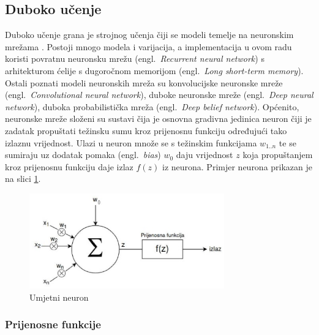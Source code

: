 \documentclass[times, utf8, zavrsni]{fer}
\begin{document}
\subsection{Duboko učenje}

Duboko učenje grana je strojnog učenja čiji se modeli temelje na neuronskim mrežama \citep{cupic}. Postoji mnogo modela i varijacija, a implementacija u ovom radu koristi povratnu neuronsku mrežu (engl.~\emph{Recurrent neural network}) s arhitekturom ćelije s dugoročnom memorijom (engl.~\emph{Long short-term memory}). Ostali poznati modeli neuronskih mreža su konvolucijske neuronske mreže (engl.~\emph{Convolutional neural network}), duboke neuronske mreže (engl.~\emph{Deep neural network}), duboka probabilistička mreža (engl.~\emph{Deep belief network}). Općenito, neuronske mreže složeni su sustavi čija je osnovna gradivna jedinica neuron čiji je zadatak propuštati težinsku sumu kroz prijenosnu funkciju određujući tako izlaznu vrijednost. Ulazi u neuron množe se s težinskim funkcijama $w_{1..n}$ te se sumiraju uz dodatak pomaka (engl.~\emph{bias}) $w_0$ daju vrijednost $z$ koja propuštanjem kroz prijenosnu funkciju daje izlaz $f(z)$ iz neurona. Primjer neurona prikazan je na slici \ref{neuron}.  


\begin{figure}[h]
	\centering
	\includegraphics[width=0.75\textwidth]{neuron}
	\caption{Umjetni neuron}
	\label{neuron}
\end{figure}

\subsubsection{Prijenosne funkcije}
\end{document}
